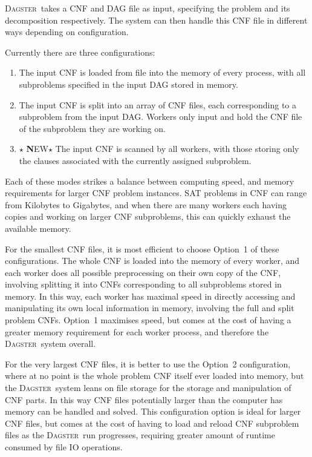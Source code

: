 \documentclass[10pt,a4paper,oneside,headinclude,footinclude,BCOR5mm]{scrartcl}
\newcommand{\dagster}{\textsc{Dagster}\xspace}
\begin{document}
\dagster\ takes a CNF and DAG file as input, specifying the problem and its decomposition respectively.
The system can then handle this CNF file in different ways depending on configuration.

Currently there are three configurations:
\begin{enumerate}
\item	The input CNF is loaded from file into the memory of every process, with all subproblems specified in the input DAG stored in memory.

  
\item	The input CNF is split into an array of CNF files, each corresponding to a subproblem from the input DAG. Workers only input and hold the CNF file of the subproblem they are working on.
  
\item	$\star$ {\textbf NEW}$\star$ The input CNF is scanned by all workers, with those storing only the clauses associated with the currently assigned subproblem.
  
\end{enumerate}

Each of these modes strikes a balance between computing speed, and memory requirements for larger CNF problem instances.
SAT problems in CNF can range from Kilobytes to Gigabytes, and when there are many workers each having copies and working on larger CNF subproblems, this can quickly exhaust the available memory.

For the smallest CNF files, it is most efficient to choose Option~1 of these configurations.
The whole CNF is loaded into the memory of every worker, and each worker does all possible preprocessing on their own copy of the CNF, involving splitting it into CNFs corresponding to all subproblems stored in memory.
In this way, each worker has maximal speed in directly accessing and manipulating its own local information in memory, involving the full and split problem CNFs.
Option~1 maximises speed, but comes at the cost of having a greater memory requirement for each worker process, and therefore the \dagster\ system overall.

For the very largest CNF files, it is better to use the Option~2 configuration, where at no point is the whole problem CNF itself ever loaded into memory, but the \dagster\ system leans on file storage for the storage and manipulation of CNF parts.
In this way CNF files potentially larger than the computer has memory can be handled and solved.
This configuration option is ideal for larger CNF files, but comes at the cost of having to load and reload CNF subproblem files as the \dagster\ run progresses, requiring greater amount of runtime consumed by file IO operations.
\end{document}
